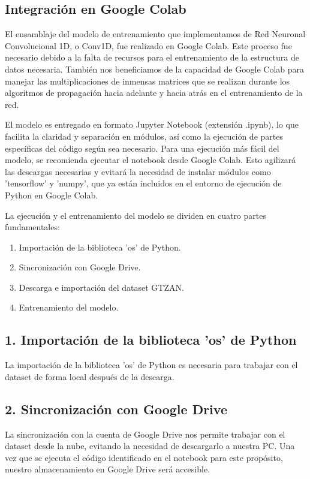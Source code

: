 \documentclass[colorinlistoftodos,twoside,twocolumn,10pt]{article} %
\begin{document}
\subsection*{Integración en Google Colab}

El ensamblaje del modelo de entrenamiento que implementamos de Red Neuronal Convolucional 1D, o Conv1D, fue realizado en Google Colab. Este proceso fue necesario debido a la falta de recursos para el entrenamiento de la estructura de datos necesaria. También nos beneficiamos de la capacidad de Google Colab para manejar las multiplicaciones de inmensas matrices que se realizan durante los algoritmos de propagación hacia adelante y hacia atrás en el entrenamiento de la red.

El modelo es entregado en formato Jupyter Notebook (extensión .ipynb), lo que facilita la claridad y separación en módulos, así como la ejecución de partes específicas del código según sea necesario. Para una ejecución más fácil del modelo, se recomienda ejecutar el notebook desde Google Colab. Esto agilizará las descargas necesarias y evitará la necesidad de instalar módulos como 'tensorflow' y 'numpy', que ya están incluidos en el entorno de ejecución de Python en Google Colab.

La ejecución y el entrenamiento del modelo se dividen en cuatro partes fundamentales:

\begin{enumerate}
\item Importación de la biblioteca 'os' de Python.
\item Sincronización con Google Drive.
\item Descarga e importación del dataset GTZAN.
\item Entrenamiento del modelo.
\end{enumerate}

\subsection*{1. Importación de la biblioteca 'os' de Python}

La importación de la biblioteca 'os' de Python es necesaria para trabajar con el dataset de forma local después de la descarga.

\subsection*{2. Sincronización con Google Drive}

La sincronización con la cuenta de Google Drive nos permite trabajar con el dataset desde la nube, evitando la necesidad de descargarlo a nuestra PC. Una vez que se ejecuta el código identificado en el notebook para este propósito, nuestro almacenamiento en Google Drive será accesible.
\end{document}
